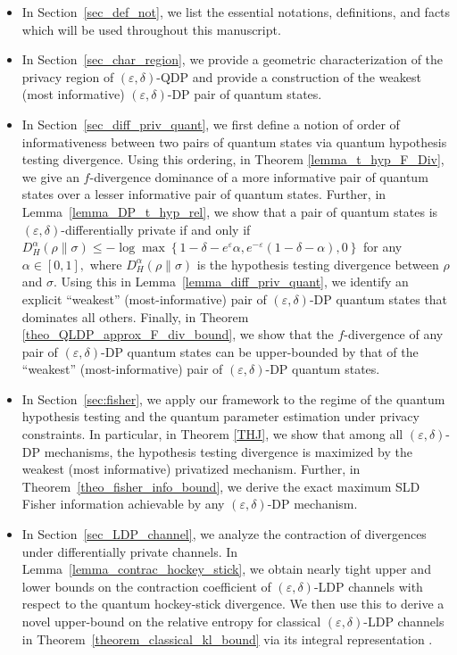 \documentclass[onecolumn,ldraftcls, 11pt]{IEEEtran}
\newcommand{\eps}{\varepsilon}
\begin{document}
\begin{itemize}
    \item In Section~\ref{sec_def_not}, we list the essential notations, definitions, and facts which will be used throughout this manuscript. 

   \item In Section~\ref{sec_char_region}, we provide a geometric characterization of the privacy region of $(\eps,\delta)$-QDP and provide a construction of the weakest (most informative) $(\eps,\delta)$-DP pair of quantum states.
    \item In Section~\ref{sec_diff_priv_quant}, we first define a notion of order of informativeness between two pairs of quantum states via quantum hypothesis testing divergence. Using this ordering, in Theorem \ref{lemma_t_hyp_F_Div}, we give an $f$-divergence dominance of a more informative pair of quantum states over a lesser informative pair of quantum states. Further, in Lemma~\ref{lemma_DP_t_hyp_rel}, we show that a pair of quantum states is $(\eps,\delta)$-differentially private if and only if  $D^{\alpha}_{H} {(\rho\|\sigma)} \leq -\log \max\left\{1 - \delta - e^{\eps}\alpha, e^{-\eps}(1 -\delta - \alpha),0\right\}$ for any $\alpha \in [0,1],$ where $D^{\alpha}_{H} {(\rho\|\sigma)}$ is the hypothesis testing divergence between $\rho$ and $\sigma.$ Using this in Lemma~\ref{lemma_diff_priv_quant},  we identify an explicit ``weakest'' (most-informative) pair of $(\eps,\delta)$-DP quantum states that dominates all others. Finally, in Theorem \ref{theo_QLDP_approx_F_div_bound}, we show that the $f$-divergence of any pair of $(\eps,\delta)$-DP quantum states can be upper-bounded by that of the ``weakest'' (most-informative) pair of $(\eps,\delta)$-DP quantum states.
 
    \item In Section~\ref{sec:fisher}, we apply our framework to the regime of the quantum hypothesis testing and the quantum parameter estimation under privacy constraints. In particular, in Theorem \ref{THJ}, we show that among all $(\eps,\delta)$-DP mechanisms, the hypothesis testing divergence is maximized by the weakest (most informative) privatized mechanism. Further, in Theorem~\ref{theo_fisher_info_bound}, we derive the exact maximum SLD Fisher information achievable by any $(\eps,\delta)$-DP mechanism.

    \item In Section~\ref{sec_LDP_channel}, we analyze the contraction of divergences under differentially private channels. In Lemma~\ref{lemma_contrac_hockey_stick}, we obtain nearly tight upper and lower bounds on the contraction coefficient of $(\eps,\delta)$-LDP channels with respect to the quantum hockey-stick divergence. We then use this to derive a novel upper-bound on the relative entropy for classical $(\eps,\delta)$-LDP channels in Theorem~\ref{theorem_classical_kl_bound} via its integral representation \cite{Sason_2016}.
\end{itemize}
\end{document}
